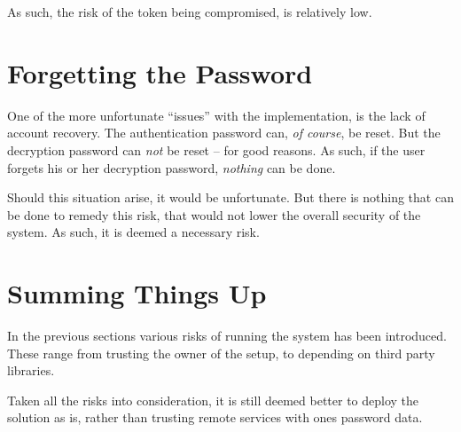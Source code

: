 		As such, the risk of the token being compromised, is relatively low.



	\section{Forgetting the Password}
		One of the more unfortunate ``issues'' with the implementation, is the lack of account recovery. The authentication password can, \emph{of course}, be reset. But the decryption password can \emph{not} be reset -- for good reasons. As such, if the user forgets his or her decryption password, \emph{nothing} can be done.

		Should this situation arise, it would be unfortunate. But there is nothing that can be done to remedy this risk, that would not lower the overall security of the system. As such, it is deemed a necessary risk.

	\section{Summing Things Up}
		In the previous sections various risks of running the system has been introduced. These range from trusting the owner of the setup, to depending on third party libraries.




		Taken all the risks into consideration, it is still deemed better to deploy the solution as is, rather than trusting remote services with ones password data.
